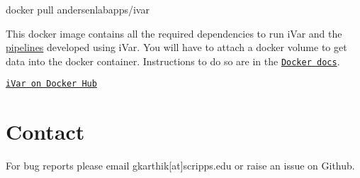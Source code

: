 \begin{DoxyCode}
docker pull andersenlabapps/ivar
\end{DoxyCode}


This docker image contains all the required dependencies to run i\+Var and the \mbox{\hyperlink{cookbookpage}{pipelines}} developed using i\+Var. You will have to attach a docker volume to get data into the docker container. Instructions to do so are in the \href{https://docs.docker.com/storage/volumes/}{\tt Docker docs}.

\href{https://hub.docker.com/r/andersenlabapps/ivar/}{\tt i\+Var on Docker Hub}\hypertarget{installpage_autotoc_md12}{}\section{Contact}\label{installpage_autotoc_md12}
For bug reports please email gkarthik\mbox{[}at\mbox{]}scripps.\+edu or raise an issue on Github. 